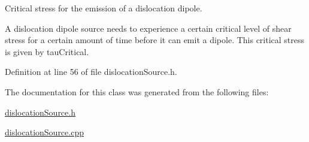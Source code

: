 Critical stress for the emission of a dislocation dipole. 

A dislocation dipole source needs to experience a certain critical level of shear stress for a certain amount of time before it can emit a dipole. This critical stress is given by tau\-Critical. 

Definition at line 56 of file dislocation\-Source.\-h.



The documentation for this class was generated from the following files\-:\begin{DoxyCompactItemize}
\item 
\hyperlink{dislocationSource_8h}{dislocation\-Source.\-h}\item 
\hyperlink{dislocationSource_8cpp}{dislocation\-Source.\-cpp}\end{DoxyCompactItemize}
